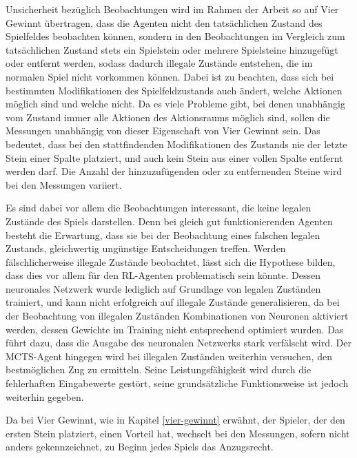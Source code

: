 Unsicherheit bezüglich Beobachtungen wird im Rahmen der Arbeit so auf Vier Gewinnt übertragen, dass die Agenten nicht den tatsächlichen Zustand des Spielfeldes beobachten können, sondern in den Beobachtungen im Vergleich zum tatsächlichen Zustand stets ein Spielstein oder mehrere Spielsteine hinzugefügt oder entfernt werden, sodass dadurch illegale Zustände entstehen, die im normalen Spiel nicht vorkommen können. Dabei ist zu beachten, dass sich bei bestimmten Modifikationen des Spielfeldzustands auch ändert, welche Aktionen möglich sind und welche nicht. Da es viele Probleme gibt, bei denen unabhängig vom Zustand immer alle Aktionen des Aktionsraums möglich sind, sollen die Messungen unabhängig von dieser Eigenschaft von Vier Gewinnt sein. Das bedeutet, dass bei den stattfindenden Modifikationen des Zustands nie der letzte Stein einer Spalte platziert, und auch kein Stein aus einer vollen Spalte entfernt werden darf. Die Anzahl der hinzuzufügenden oder zu entfernenden Steine wird bei den Messungen variiert.

Es sind dabei vor allem die Beobachtungen interessant, die keine legalen Zustände des Spiels darstellen. Denn bei gleich gut funktionierenden Agenten besteht die Erwartung, dass sie bei der Beobachtung eines falschen legalen Zustands, gleichwertig ungünstige Entscheidungen treffen. Werden fälschlicherweise illegale Zustände beobachtet, lässt sich die Hypothese bilden, dass dies vor allem für den RL-Agenten problematisch sein könnte. Dessen neuronales Netzwerk wurde lediglich auf Grundlage von legalen Zuständen trainiert, und kann nicht erfolgreich auf illegale Zustände generalisieren, da bei der Beobachtung von illegalen Zuständen Kombinationen von Neuronen aktiviert werden, dessen Gewichte im Training nicht entsprechend optimiert wurden. Das führt dazu, dass die Ausgabe des neuronalen Netzwerks stark verfälscht wird. Der MCTS-Agent hingegen wird bei illegalen Zuständen weiterhin versuchen, den bestmöglichen Zug zu ermitteln. Seine Leistungsfähigkeit wird durch die fehlerhaften Eingabewerte gestört, seine grundsätzliche Funktionsweise ist jedoch weiterhin gegeben.

Da bei Vier Gewinnt, wie in Kapitel \ref{vier-gewinnt} erwähnt, der Spieler, der den ersten Stein platziert, einen Vorteil hat, wechselt bei den Messungen, sofern nicht anders gekennzeichnet, zu Beginn jedes Spiels das Anzugsrecht.

